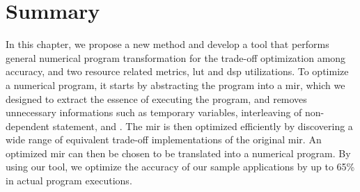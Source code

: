 \section{Summary}
\label{po:sec:conclusion}

In this chapter, we propose a new method and develop a tool that performs
general numerical program transformation for the trade-off optimization
among accuracy, and two resource related metrics, \gls{lut} and \gls{dsp}
utilizations.  To optimize a numerical program, it starts by abstracting the
program into a \gls{mir}, which we designed to extract the essence of executing
the program, and removes unnecessary informations such as temporary variables,
interleaving of non-dependent statement, and \etc.  The \gls{mir} is then
optimized efficiently by discovering a wide range of equivalent trade-off
implementations of the original \gls{mir}\@.  An optimized \gls{mir} can then
be chosen to be translated into a numerical program.  By using our tool, we
optimize the accuracy of our sample applications by up to 65\% in actual
program executions.
